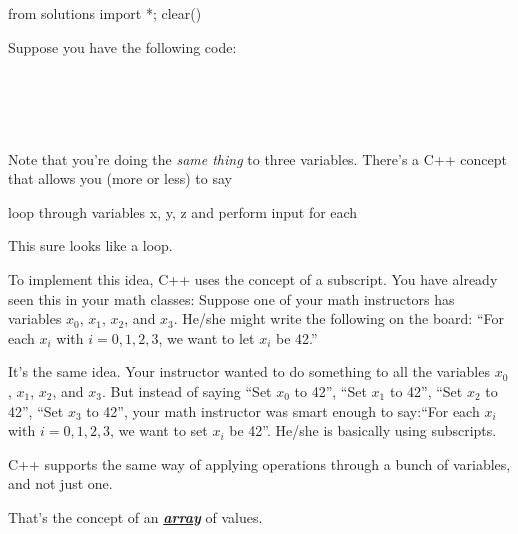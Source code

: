 \begin{python0}
from solutions import *; clear()
\end{python0}

Suppose you have the following code:

\\
\\
\\
\\
Note that you're doing the \emph{same thing} to three variables. There's a C++ concept that allows you (more or less) to say
\begin{center}
loop through variables x, y, z and perform input for each
\end{center}
This sure looks like a loop.

To implement this idea, C++ uses the concept of a subscript. You have already seen this in your math classes: Suppose one of your math instructors has variables $x_{0}$, $x_{1}$, $x_{2}$, and $x_{3}$. He/she might write the following on the board: ``For each $x_{i}$ with $i = 0, 1, 2, 3$, we want to let $x_{i}$ be 42.''

It's the same idea. Your instructor wanted to do something to all the variables $x_{0}$, $x_{1}$, $x_{2}$, and $x_{3}$. But instead of saying ``Set $x_{0}$ to 42'', ``Set $x_{1}$ to 42'', ``Set $x_{2}$ to 42'', ``Set $x_{3}$ to 42'', your math instructor was smart enough to say:``For each $x_{i}$ with $i = 0, 1, 2, 3$, we want to set $x_{i}$ be 42''. He/she is basically using subscripts.

C++ supports the same way of applying operations through a bunch of variables, and not just one.

That's the concept of an \underline{\emph{\textbf{array}}} of values.

